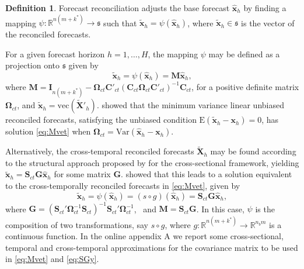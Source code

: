 \documentclass[a4paper,11pt]{article}
\newcommand{\xvet}{\bm{x}}
\newcommand{\Cvet}{\bm{C}}
\newcommand{\Gvet}{\bm{G}}
\newcommand{\Ivet}{\bm{I}}
\newcommand{\Mvet}{\bm{M}}
\newcommand{\Svet}{\bm{S}}
\newcommand{\Xvet}{\bm{X}}
\newcommand{\Omegavet}{\bm{\Omega}}
\theoremstyle{definition}
\newtheorem{definition}{Definition}[section]
\begin{document}
\begin{definition}
	Forecast reconciliation adjusts the base forecast $\widehat{\xvet}_{h}$ by finding a mapping $\psi: \mathbb{R}^{n(m+k^\ast)} \rightarrow \mathfrak{s}$ such that $\widetilde{\xvet}_{h} = \psi\left(\widehat{\xvet}_{h}\right)$, where $\widetilde{\xvet}_{h} \in \mathfrak{s}$ is the vector of the reconciled forecasts.
\end{definition}

For a given forecast horizon $h = 1,\dots, H$, the mapping $\psi$ may be defined as a projection onto $\mathfrak{s}$ given by \citep{panagiotelis2021, difonzo2023}
\begin{equation}
	\label{eq:Mvet}
	\widetilde{\xvet}_{h} = \psi\left(\widehat{\xvet}_h\right) = \Mvet \widehat{\xvet}_h,
\end{equation}
where $\Mvet = \Ivet_{n(m+ k^\ast)} - \Omegavet_{ct}\Cvet'_{ct}\left(\Cvet_{ct}\Omegavet_{ct}\Cvet'_{ct}\right)^{-1}\Cvet_{ct}$, for a positive definite matrix $\Omegavet_{ct}$, and $\widetilde{\xvet}_{h} = \mathrm{vec}(\widetilde{\Xvet}'_{h})$.
\citet{wickramasuriya2019} showed that the minimum variance linear unbiased reconciled forecasts, satisfying the unbiased condition $\text{E}(\widetilde{\xvet}_h -\xvet_h) = 0$, has solution \eqref{eq:Mvet} when $\Omegavet_{ct} = \text{Var}(\widehat{\xvet}_h -\xvet_h)$.

Alternatively, the cross-temporal reconciled forecasts $\widetilde{\Xvet}_{h}$ may be found according to the structural approach proposed by \cite{hyndman2011} for the cross-sectional framework, yielding $\widetilde{\xvet}_h = \Svet_{ct}\Gvet \widehat{\xvet}_h$ for some matrix $\Gvet$. \citet{wickramasuriya2019} showed that this leads to a solution equivalent to the cross-temporally reconciled forecasts in \eqref{eq:Mvet}, given by
\begin{equation}\label{eq:SGy}
	\widetilde{\xvet}_{h} = \psi\left(\widehat{\xvet}_h \right) = \left(s \circ g \right)\left(\widehat{\xvet}_h\right)=\Svet_{ct}\Gvet \widehat{\xvet}_{h},
\end{equation}
where $\Gvet = (\Svet_{ct}' \Omegavet_{ct}^{-1}\Svet_{ct})^{-1} \Svet_{ct}'\Omegavet_{ct}^{-1}$,~ and $\Mvet = \Svet_{ct} \Gvet$. In this case, $\psi$ is the composition of two transformations, say $s \circ g$, where $g: \mathbb{R}^{n(m+k^\ast)} \rightarrow \mathbb{R}^{n_b m}$ is a continuous function. In the online appendix A we report some cross-sectional, temporal and cross-temporal approximations for the covariance matrix to be used in \eqref{eq:Mvet} and \eqref{eq:SGy}.
\end{document}
